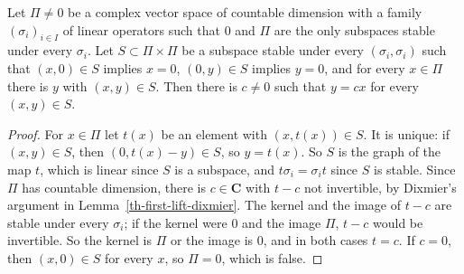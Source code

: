 \begin{lemma}\label{th-kernel-graph}
Let $\Pi\neq0$ be a complex vector space of countable dimension with a family
$(\sigma_i)_{i\in I}$ of linear operators such that $0$ and $\Pi$ are the only
subspaces stable under every $\sigma_i$. Let $S\subset\Pi\times\Pi$ be a
subspace stable under every $(\sigma_i,\sigma_i)$ such that $(x,0)\in S$
implies $x=0$, $(0,y)\in S$ implies $y=0$, and for every $x\in\Pi$ there is
$y$ with $(x,y)\in S$. Then there is $c\neq0$ such that $y=cx$ for every
$(x,y)\in S$.
\end{lemma}
\begin{proof}
For $x\in\Pi$ let $t(x)$ be an element with $(x,t(x))\in S$. It is unique: if
$(x,y)\in S$, then $(0,t(x)-y)\in S$, so $y=t(x)$. So $S$ is the graph of the
map $t$, which is linear since $S$ is a subspace, and $t\sigma_i=\sigma_it$
since $S$ is stable. Since $\Pi$ has countable dimension, there is
$c\in\mathbf C$ with $t-c$ not invertible, by Dixmier's argument in
Lemma~\ref{th-first-lift-dixmier}. The kernel and the image of $t-c$ are stable
under every $\sigma_i$; if the kernel were $0$ and the image $\Pi$, $t-c$ would
be invertible. So the kernel is $\Pi$ or the image is $0$, and in both cases
$t=c$. If $c=0$, then $(x,0)\in S$ for every $x$, so $\Pi=0$, which is false.
\end{proof}

